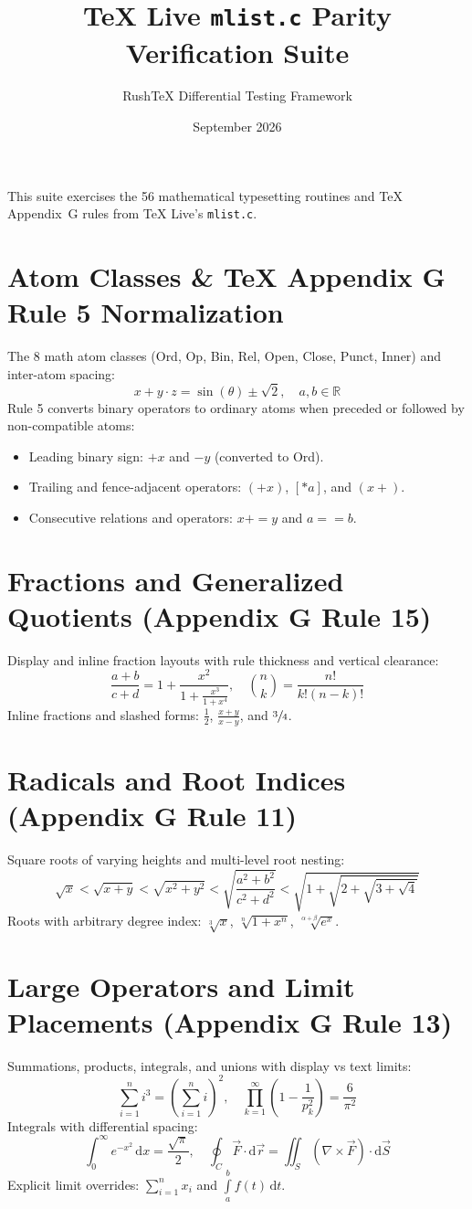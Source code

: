 \documentclass{article}
\title{\textbf{TeX Live \texttt{mlist.c} Parity Verification Suite}}
\author{RushTeX Differential Testing Framework}
\date{September 2026}
\begin{document}
\maketitle

This suite exercises the 56 mathematical typesetting routines and TeX Appendix~G rules from TeX Live's \texttt{mlist.c}.

\section{Atom Classes \& TeX Appendix G Rule 5 Normalization}
The 8 math atom classes (Ord, Op, Bin, Rel, Open, Close, Punct, Inner) and inter-atom spacing:
\[
x + y \cdot z = \sin(\theta) \pm \sqrt{2}, \quad a, b \in \mathbb{R}
\]
Rule 5 converts binary operators to ordinary atoms when preceded or followed by non-compatible atoms:
\begin{itemize}
    \item Leading binary sign: $+x$ and $-y$ (converted to Ord).
    \item Trailing and fence-adjacent operators: $(+x)$, $[*a]$, and $(x+)$.
    \item Consecutive relations and operators: $x + = y$ and $a = = b$.
\end{itemize}

\section{Fractions and Generalized Quotients (Appendix G Rule 15)}
Display and inline fraction layouts with rule thickness and vertical clearance:
\[
\frac{a + b}{c + d} = 1 + \frac{x^2}{1 + \frac{x^3}{1 + x^4}}, \quad \binom{n}{k} = \frac{n!}{k!(n-k)!}
\]
Inline fractions and slashed forms: $\frac{1}{2}$, $\frac{x+y}{x-y}$, and $\sfrac{3}{4}$.

\section{Radicals and Root Indices (Appendix G Rule 11)}
Square roots of varying heights and multi-level root nesting:
\[
\sqrt{x} < \sqrt{x + y} < \sqrt{x^2 + y^2} < \sqrt{\frac{a^2 + b^2}{c^2 + d^2}} < \sqrt{1 + \sqrt{2 + \sqrt{3 + \sqrt{4}}}}
\]
Roots with arbitrary degree index: $\sqrt[3]{x}$, $\sqrt[n]{1 + x^n}$, $\sqrt[\alpha + \beta]{e^x}$.

\section{Large Operators and Limit Placements (Appendix G Rule 13)}
Summations, products, integrals, and unions with display vs text limits:
\[
\sum_{i=1}^n i^3 = \left( \sum_{i=1}^n i \right)^2, \quad \prod_{k=1}^\infty \left( 1 - \frac{1}{p_k^2} \right) = \frac{6}{\pi^2}
\]
Integrals with differential spacing:
\[
\int_0^\infty e^{-x^2} \, \mathrm{d}x = \frac{\sqrt{\pi}}{2}, \quad \oint_C \vec{F} \cdot \mathrm{d}\vec{r} = \iint_S (\nabla \times \vec{F}) \cdot \mathrm{d}\vec{S}
\]
Explicit limit overrides: $\sum\nolimits_{i=1}^n x_i$ and $\int\limits_a^b f(t)\,\mathrm{d}t$.
\end{document}
